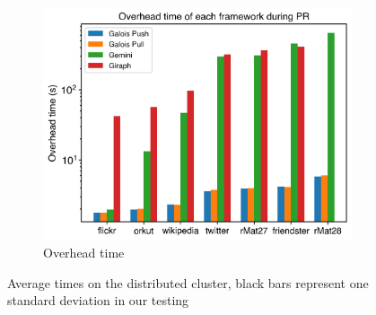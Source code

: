 \begin{figure}
\begin{subfigure}{0.3\textwidth}
		\includegraphics[width=\linewidth]{../../plots/distributedPR_overheadTime.png}
		\caption{Overhead time}
		\label{fig:distributedPR_overheadNormalized}
	\end{subfigure}
	
	\caption{Average times on the distributed cluster, black bars represent one standard deviation in our testing}
	\label{fig:distributedPR}
\end{figure}









